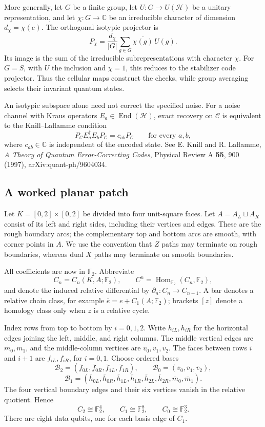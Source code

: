 More generally, let $G$ be a finite group, let
$U:G\to U(\mathcal H)$ be a unitary representation, and let
$\chi:G\to\mathbb C$ be an irreducible character of dimension
$d_\chi=\chi(e)$. The orthogonal isotypic projector is
\[
 P_\chi=\frac{d_\chi}{|G|}
 \sum_{g\in G}\overline{\chi(g)}\,U(g).
\]
Its image is the sum of the irreducible subrepresentations with
character $\chi$. For $G=S$, with $U$ the inclusion and $\chi=1$,
this reduces to the stabilizer code projector. Thus the cellular
maps construct the checks, while group averaging selects their
invariant quantum states.

An isotypic subspace alone need not correct the specified noise.
For a noise channel with Kraus operators
$E_a\in\operatorname{End}(\mathcal H)$, exact recovery on
$\mathcal C$ is equivalent to the Knill--Laflamme condition
\[
 P_{\mathcal C}E_a^{\dagger}E_bP_{\mathcal C}
 =c_{ab}P_{\mathcal C}\qquad\text{for every }a,b,
\]
where $c_{ab}\in\mathbb C$ is independent of the encoded state.
See E. Knill and R. Laflamme, \emph{A Theory of Quantum Error-Correcting
Codes}, Physical Review A \textbf{55}, 900 (1997),
arXiv:quant-ph/9604034.

\subsection*{A worked planar patch}

Let $K=[0,2]\times[0,2]$ be divided into four unit-square faces.
Let $A=A_L\sqcup A_R$ consist of its left and right sides, including
their vertices and edges. These are the rough boundary arcs; the
complementary top and bottom arcs are smooth, with corner points in $A$.
We use the convention that $Z$ paths
may terminate on rough boundaries, whereas dual $X$ paths may
terminate on smooth boundaries.

All coefficients are now in $\mathbb F_2$. Abbreviate
\[
 C_n=C_n(K,A;\mathbb F_2),\qquad
 C^n=\operatorname{Hom}_{\mathbb F_2}(C_n,\mathbb F_2),
\]
and denote the induced relative differential by
$\partial_n:C_n\to C_{n-1}$. A bar denotes a relative chain class,
for example $\bar e=e+C_1(A;\mathbb F_2)$; brackets $[z]$ denote a
homology class only when $z$ is a relative cycle.

Index rows from top to bottom by $i=0,1,2$. Write $h_{iL},h_{iR}$
for the horizontal edges joining the left, middle, and right columns.
The middle vertical edges are $m_0,m_1$, and the middle-column
vertices are $v_0,v_1,v_2$. The faces between rows $i$ and $i+1$ are
$f_{iL},f_{iR}$, for $i=0,1$. Choose ordered bases
\[
 \mathcal B_2=(\bar f_{0L},\bar f_{0R},\bar f_{1L},\bar f_{1R}),
 \qquad \mathcal B_0=(\bar v_0,\bar v_1,\bar v_2),
\]
\[
 \mathcal B_1=(\bar h_{0L},\bar h_{0R},\bar h_{1L},\bar h_{1R},
 \bar h_{2L},\bar h_{2R},\bar m_0,\bar m_1).
\]
The four vertical boundary edges and their six vertices vanish in
the relative quotient. Hence
\[
 C_2\cong\mathbb F_2^4,\qquad C_1\cong\mathbb F_2^8,
 \qquad C_0\cong\mathbb F_2^3.
\]
There are eight data qubits, one for each basis edge of $C_1$.

